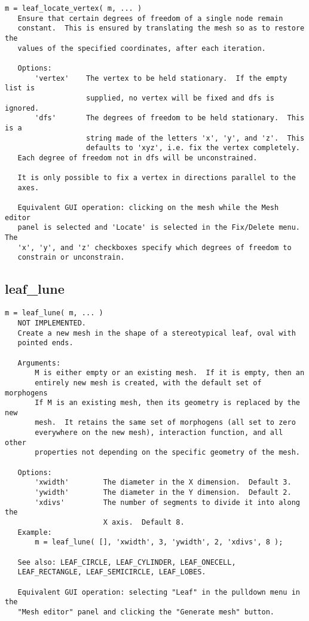 \begin{verbatim}
m = leaf_locate_vertex( m, ... )
   Ensure that certain degrees of freedom of a single node remain
   constant.  This is ensured by translating the mesh so as to restore the
   values of the specified coordinates, after each iteration.

   Options:
       'vertex'    The vertex to be held stationary.  If the empty list is
                   supplied, no vertex will be fixed and dfs is ignored.
       'dfs'       The degrees of freedom to be held stationary.  This is a
                   string made of the letters 'x', 'y', and 'z'.  This
                   defaults to 'xyz', i.e. fix the vertex completely.
   Each degree of freedom not in dfs will be unconstrained.

   It is only possible to fix a vertex in directions parallel to the
   axes.

   Equivalent GUI operation: clicking on the mesh while the Mesh editor
   panel is selected and 'Locate' is selected in the Fix/Delete menu.  The
   'x', 'y', and 'z' checkboxes specify which degrees of freedom to
   constrain or unconstrain.
\end{verbatim}

\subsection{leaf\_lune}\label{section-leaf-lune}

\begin{verbatim}
m = leaf_lune( m, ... )
   NOT IMPLEMENTED.
   Create a new mesh in the shape of a stereotypical leaf, oval with
   pointed ends.

   Arguments:
       M is either empty or an existing mesh.  If it is empty, then an
       entirely new mesh is created, with the default set of morphogens
       If M is an existing mesh, then its geometry is replaced by the new
       mesh.  It retains the same set of morphogens (all set to zero
       everywhere on the new mesh), interaction function, and all other
       properties not depending on the specific geometry of the mesh.

   Options:
       'xwidth'        The diameter in the X dimension.  Default 3.
       'ywidth'        The diameter in the Y dimension.  Default 2.
       'xdivs'         The number of segments to divide it into along the
                       X axis.  Default 8.
   Example:
       m = leaf_lune( [], 'xwidth', 3, 'ywidth', 2, 'xdivs', 8 );

   See also: LEAF_CIRCLE, LEAF_CYLINDER, LEAF_ONECELL,
   LEAF_RECTANGLE, LEAF_SEMICIRCLE, LEAF_LOBES.

   Equivalent GUI operation: selecting "Leaf" in the pulldown menu in the
   "Mesh editor" panel and clicking the "Generate mesh" button.
\end{verbatim}

